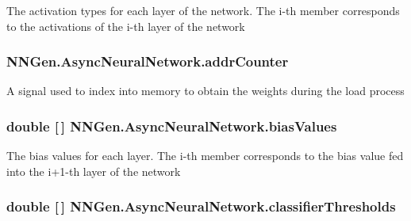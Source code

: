 The activation types for each layer of the network. The i-\/th member corresponds to the activations of the i-\/th layer of the network 

\hypertarget{class_n_n_gen_1_1_async_neural_network_a62f80368a823158ee82fd29b879ad157}{}
\subsubsection[{addr\+Counter}]{ N\+N\+Gen.\+Async\+Neural\+Network.\+addr\+Counter\hspace{0.3cm}{\ttfamily [get]}}\label{class_n_n_gen_1_1_async_neural_network_a62f80368a823158ee82fd29b879ad157}


A signal used to index into memory to obtain the weights during the load process 

\hypertarget{class_n_n_gen_1_1_async_neural_network_aaccc75ccaaf278324874a5c3b45d711f}{}
\subsubsection[{bias\+Values}]{\setlength{\rightskip}{0pt plus 5cm}double \mbox{[}$\,$\mbox{]} N\+N\+Gen.\+Async\+Neural\+Network.\+bias\+Values\hspace{0.3cm}{\ttfamily [get]}}\label{class_n_n_gen_1_1_async_neural_network_aaccc75ccaaf278324874a5c3b45d711f}


The bias values for each layer. The i-\/th member corresponds to the bias value fed into the i+1-\/th layer of the network 

\hypertarget{class_n_n_gen_1_1_async_neural_network_a9a2da98105807d64bf8d25f9f4279d3f}{}
\subsubsection[{classifier\+Thresholds}]{\setlength{\rightskip}{0pt plus 5cm}double \mbox{[}$\,$\mbox{]} N\+N\+Gen.\+Async\+Neural\+Network.\+classifier\+Thresholds\hspace{0.3cm}{\ttfamily [get]}}\label{class_n_n_gen_1_1_async_neural_network_a9a2da98105807d64bf8d25f9f4279d3f}


